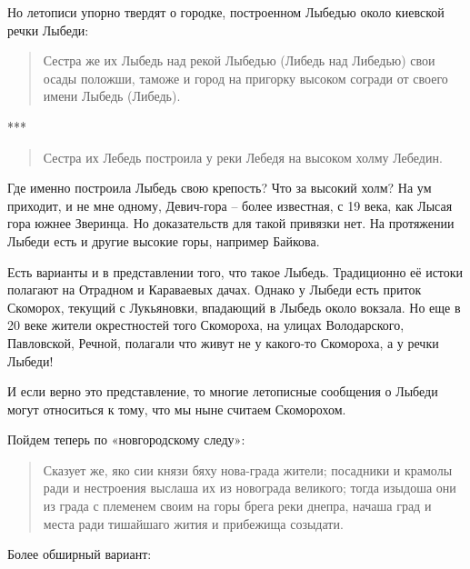 Но летописи упорно твердят о городке, построенном Лыбедью около киевской речки Лыбеди: 

\begin{quotation}
Сестра же их Лыбедь над рекой Лыбедью (Либедь над Либедью) свои осады положши, таможе и город на пригорку высоком согради от своего имени Лыбедь (Либедь).
\end{quotation}

\begin{center}***\end{center}

\begin{quotation}
Сестра их Лебедь построила у реки Лебедя на высоком холму Лебедин.
\end{quotation}

Где именно построила Лыбедь свою крепость? Что за высокий холм? На ум приходит, и не мне одному, Девич-гора – более известная, с 19 века, как Лысая гора южнее Зверинца. Но доказательств для такой привязки нет. На протяжении Лыбеди есть и другие высокие горы, например Байкова.

Есть варианты и в представлении того, что такое Лыбедь. Традиционно её истоки полагают на Отрадном и Караваевых дачах. Однако у Лыбеди есть приток Скоморох, текущий с Лукьяновки, впадающий в Лыбедь около вокзала. Но еще в 20 веке жители окрестностей того Скомороха, на улицах Володарского, Павловской, Речной, полагали что живут не у какого-то Скомороха, а у речки Лыбеди!

И если верно это представление, то многие летописные сообщения о Лыбеди могут относиться к тому, что мы ныне считаем Скоморохом.

Пойдем теперь по «новгородскому следу»:

\begin{quotation}
Сказует же, яко сии князи бяху нова-града жители; посадники и крамолы ради и нестроения выслаша их из новограда великого; тогда изыдоша они из града с племенем своим на горы брега реки днепра, начаша град и места ради тишайшаго жития и прибежища созыдати.
\end{quotation}

Более обширный вариант:

